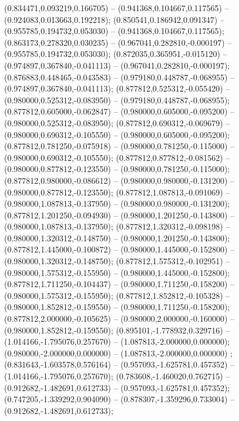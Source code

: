  (0.834471,0.093219,0.166705) -- (0.941368,0.104667,0.117565) -- (0.924083,0.013663,0.192218);
 (0.850541,0.186942,0.091347) -- (0.955785,0.194732,0.053030) -- (0.941368,0.104667,0.117565);
 (0.863173,0.278320,0.030235) -- (0.967041,0.282810,-0.000197) -- (0.955785,0.194732,0.053030);
 (0.872035,0.365951,-0.015120) -- (0.974897,0.367840,-0.041113) -- (0.967041,0.282810,-0.000197);
 (0.876883,0.448465,-0.043583) -- (0.979180,0.448787,-0.068955) -- (0.974897,0.367840,-0.041113);
 (0.877812,0.525312,-0.055420) -- (0.980000,0.525312,-0.083950) -- (0.979180,0.448787,-0.068955);
 (0.877812,0.605000,-0.062847) -- (0.980000,0.605000,-0.095200) -- (0.980000,0.525312,-0.083950);
 (0.877812,0.690312,-0.069679) -- (0.980000,0.690312,-0.105550) -- (0.980000,0.605000,-0.095200);
 (0.877812,0.781250,-0.075918) -- (0.980000,0.781250,-0.115000) -- (0.980000,0.690312,-0.105550);
 (0.877812,0.877812,-0.081562) -- (0.980000,0.877812,-0.123550) -- (0.980000,0.781250,-0.115000);
 (0.877812,0.980000,-0.086612) -- (0.980000,0.980000,-0.131200) -- (0.980000,0.877812,-0.123550);
 (0.877812,1.087813,-0.091069) -- (0.980000,1.087813,-0.137950) -- (0.980000,0.980000,-0.131200);
 (0.877812,1.201250,-0.094930) -- (0.980000,1.201250,-0.143800) -- (0.980000,1.087813,-0.137950);
 (0.877812,1.320312,-0.098198) -- (0.980000,1.320312,-0.148750) -- (0.980000,1.201250,-0.143800);
 (0.877812,1.445000,-0.100872) -- (0.980000,1.445000,-0.152800) -- (0.980000,1.320312,-0.148750);
 (0.877812,1.575312,-0.102951) -- (0.980000,1.575312,-0.155950) -- (0.980000,1.445000,-0.152800);
 (0.877812,1.711250,-0.104437) -- (0.980000,1.711250,-0.158200) -- (0.980000,1.575312,-0.155950);
 (0.877812,1.852812,-0.105328) -- (0.980000,1.852812,-0.159550) -- (0.980000,1.711250,-0.158200);
 (0.877812,2.000000,-0.105625) -- (0.980000,2.000000,-0.160000) -- (0.980000,1.852812,-0.159550);
 (0.895101,-1.778932,0.329716) -- (1.014166,-1.795076,0.257670) -- (1.087813,-2.000000,0.000000);
 (0.980000,-2.000000,0.000000) -- (1.087813,-2.000000,0.000000) ;
 (0.831643,-1.603578,0.576164) -- (0.957093,-1.625781,0.457352) -- (1.014166,-1.795076,0.257670);
 (0.783608,-1.460020,0.762715) -- (0.912682,-1.482691,0.612733) -- (0.957093,-1.625781,0.457352);
 (0.747205,-1.339292,0.904090) -- (0.878307,-1.359296,0.733004) -- (0.912682,-1.482691,0.612733);
